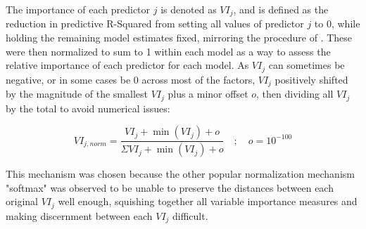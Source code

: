 \documentclass[11pt, a4paper, table]{article}
\begin{document}
The importance of each predictor $j$ is denoted as $VI_j$, and is defined as the reduction in predictive R-Squared from setting all values of predictor $j$ to 0, while holding the remaining model estimates fixed, mirroring the procedure of \cite{gu_empirical_2018}. These were then normalized to sum to 1 within each model as a way to assess the relative importance of each predictor for each model. As $VI_j$ can sometimes be negative, or in some cases be 0 across most of the factors, $VI_j$ positively shifted by the magnitude of the smallest $VI_j$ plus a minor offset $o$, then dividing all $VI_j$ by the total to avoid numerical issues:

\begin{equation}
VI_{j, norm} = \frac{VI_j + \operatorname{min}(VI_j) + o}
{\Sigma VI_j + \operatorname{min}(VI_j) + o} \quad ; \quad o = 10^{-100}
\end{equation}

This mechanism was chosen because the other popular normalization mechanism "softmax" was observed to be unable to preserve the distances between each original $VI_j$ well enough, squishing together all variable importance measures and making discernment between each $VI_j$ difficult.

%
%
%
%
%
%
\end{document}
